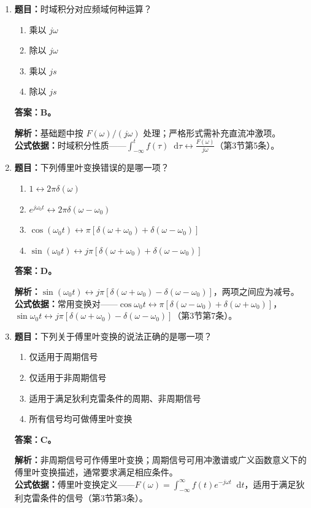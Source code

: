 \documentclass[12pt,a4paper]{ctexart}
\newcommand{\dif}{\mathop{}\!\mathrm{d}}
\begin{document}
\begin{enumerate}[label=\arabic*.]
\item \textbf{题目：}时域积分对应频域何种运算？
\begin{enumerate}[label=\Alph*.]
\item 乘以 $j\omega$
\item 除以 $j\omega$
\item 乘以 $js$
\item 除以 $js$
\end{enumerate}
\textbf{答案：B。}\par
\textbf{解析：}基础题中按 $F(\omega)/(j\omega)$ 处理；严格形式需补充直流冲激项。\\
\textbf{公式依据：}时域积分性质——$\displaystyle\int_{-\infty}^{t}f(\tau)\dif\tau\longleftrightarrow\frac{F(\omega)}{j\omega}$（第3节第5条）。

\item \textbf{题目：}下列傅里叶变换错误的是哪一项？
\begin{enumerate}[label=\Alph*.]
\item $1\longleftrightarrow2\pi\delta(\omega)$
\item $e^{j\omega_0t}\longleftrightarrow2\pi\delta(\omega-\omega_0)$
\item $\cos(\omega_0t)\longleftrightarrow\pi[\delta(\omega+\omega_0)+\delta(\omega-\omega_0)]$
\item $\sin(\omega_0t)\longleftrightarrow j\pi[\delta(\omega+\omega_0)+\delta(\omega-\omega_0)]$
\end{enumerate}
\textbf{答案：D。}\par
\textbf{解析：}\(\displaystyle \sin(\omega_0t)\longleftrightarrow j\pi[\delta(\omega+\omega_0)-\delta(\omega-\omega_0)]\)，两项之间应为减号。\\
\textbf{公式依据：}常用变换对——$\cos\omega_0t\longleftrightarrow\pi[\delta(\omega-\omega_0)+\delta(\omega+\omega_0)]$，$\sin\omega_0t\longleftrightarrow j\pi[\delta(\omega+\omega_0)-\delta(\omega-\omega_0)]$（第3节第7条）。

\item \textbf{题目：}下列关于傅里叶变换的说法正确的是哪一项？
\begin{enumerate}[label=\Alph*.]
\item 仅适用于周期信号
\item 仅适用于非周期信号
\item 适用于满足狄利克雷条件的周期、非周期信号
\item 所有信号均可做傅里叶变换
\end{enumerate}
\textbf{答案：C。}\par
\textbf{解析：}非周期信号可作傅里叶变换；周期信号可用冲激谱或广义函数意义下的傅里叶变换描述，通常要求满足相应条件。\\
\textbf{公式依据：}傅里叶变换定义——$F(\omega)=\int_{-\infty}^{\infty}f(t)e^{-j\omega t}\dif t$，适用于满足狄利克雷条件的信号（第3节第3条）。


\end{enumerate}
\end{document}
